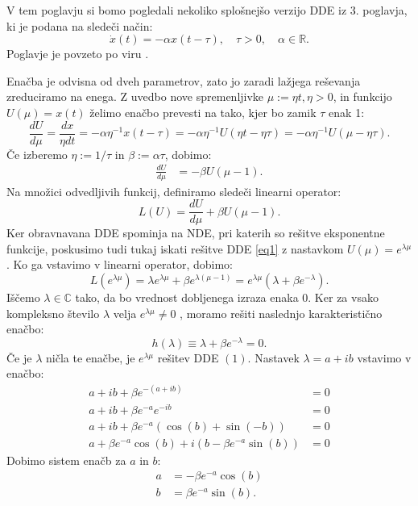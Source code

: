 \documentclass[12pt,a4paper]{amsart}
\theoremstyle{definition} %
\theoremstyle{plain} %
\newcommand{\R}{\mathbb R}
\newcommand{\C}{\mathbb C}
\begin{document}
V tem poglavju si bomo pogledali nekoliko splošnejšo verzijo DDE iz 3. poglavja, ki je podana na sledeči način:
\[\dot{x}(t)= -\alpha x(t-\tau), \quad \tau > 0,\quad \alpha \in \R.\]
Poglavje je povzeto po viru \cite{angdiploma}.


Enačba je odvisna od dveh parametrov, zato jo zaradi lažjega reševanja zreduciramo na enega.
Z uvedbo nove spremenljivke $\mu:=\eta t, \eta > 0$, in funkcijo
$U(\mu)=x(t)$ želimo enačbo prevesti na tako, kjer bo zamik $\tau$ enak 1:
\[\frac{dU}{d\mu}=\frac{dx}{\eta dt}=-\alpha \eta^{-1}x(t-\tau)=-\alpha \eta^{-1}U(\eta t - \eta \tau)=
-\alpha \eta^{-1}U(\mu - \eta \tau).\]
Če izberemo $\eta := 1/\tau$ in $\beta:=\alpha \tau$, dobimo:
\begin{equation} \label{eq1}
    \begin{split}
 \frac{dU}{d\mu} & =-\beta U(\mu -1).
    \end{split}
\end{equation}
Na množici odvedljivih funkcij, definiramo sledeči linearni operator:
\[L(U)=\frac{dU}{d\mu} + \beta U(\mu -1).\]
Ker obravnavana DDE spominja na NDE, pri katerih so rešitve eksponentne funkcije, poskusimo tudi tukaj
iskati rešitve DDE \eqref{eq1} z nastavkom $U(\mu)=e^{\lambda \mu}$. Ko ga vstavimo v linearni operator,
dobimo:
\[L(e^{\lambda \mu})= \lambda e^{\lambda \mu} + \beta e^{\lambda (\mu -1)}=
e^{\lambda \mu}(\lambda + \beta e^{-\lambda}).\]
Iščemo $\lambda \in \C$ tako, da bo vrednost dobljenega izraza enaka 0. Ker
za vsako kompleksno število $\lambda$ velja $e^{\lambda \mu} \neq 0$ , moramo rešiti naslednjo karakteristično
enačbo:
\[ h(\lambda) \equiv \lambda + \beta e^{-\lambda} =0.\]
Če je $\lambda$ ničla te enačbe, je $e^{\lambda\mu}$ rešitev DDE $(1)$.
Nastavek $\lambda = a + ib$ vstavimo v enačbo:
\begin{equation*}
    \begin{split}
        a + ib + \beta e^{-(a+ib)} &= 0 \\
        a + ib + \beta e^{-a}e^{-ib} &= 0 \\
        a + ib + \beta e^{-a}(\cos(b) + \sin(-b)) &= 0 \\
        a + \beta e^{-a}\cos(b) + i(b-\beta e^{-a}\sin(b)) &= 0
    \end{split}      
\end{equation*}
Dobimo sistem enačb za $a$ in $b$:
\begin{equation*}
    \begin{split}
        a &= -\beta e^{-a}\cos(b) \\
        b &= \beta e^{-a}\sin(b).
    \end{split}      
\end{equation*}
\end{document}

